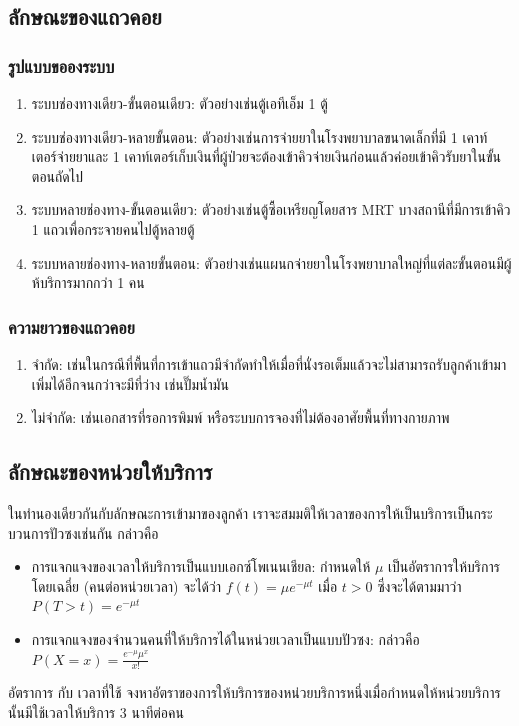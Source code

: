 \newpage
\subsection{ลักษณะของแถวคอย}
\subsubsection{รูปแบบขอองระบบ}
\begin{enumerate}
	\item ระบบช่องทางเดียว-ขั้นตอนเดียว: ตัวอย่างเช่นตู้เอทีเอ็ม 1 ตู้
	\item ระบบช่องทางเดียว-หลายขั้นตอน: ตัวอย่างเช่นการจ่ายยาในโรงพยาบาลขนาดเล็กที่มี 1 เคาท์เตอร์จ่ายยาและ 1 เคาท์เตอร์เก็บเงินที่ผู้ป่วยจะต้องเข้าคิวจ่ายเงินก่อนแล้วค่อยเข้าคิวรับยาในขั้นตอนถัดไป
	\item ระบบหลายช่องทาง-ขั้นตอนเดียว: ตัวอย่างเช่นตู้ซื้อเหรียญโดยสาร MRT บางสถานีที่มีการเข้าคิว 1 แถวเพื่อกระจายคนไปตู้หลายตู้
	\item ระบบหลายช่องทาง-หลายขั้นตอน: ตัวอย่างเช่นแผนกจ่ายยาในโรงพยาบาลใหญ่ที่แต่ละขั้นตอนมีผู้ห้บริการมากกว่า 1 คน 
\end{enumerate}

\subsubsection{ความยาวของแถวคอย}
\begin{enumerate}
	\item จำกัด: เช่นในกรณีที่พื้นที่การเข้าแถวมีจำกัดทำให้เมื่อที่นั่งรอเต็มแล้วจะไม่สามารถรับลูกค้าเข้ามาเพิ่มได้อีกจนกว่าจะมีที่ว่าง เช่นปั๊มน้ำมัน
	\item ไม่จำกัด: เช่นเอกสารที่รอการพิมพ์ หรือระบบการจองที่ไม่ต้องอาศัยพื้นที่ทางกายภาพ
\end{enumerate}

\subsection{ลักษณะของหน่วยให้บริการ}
ในทำนองเดียวกันกับลักษณะการเข้ามาของลูกค้า เราจะสมมติให้เวลาของการให้เป็นบริการเป็นกระบวนการปัวซงเช่นกัน กล่าวคือ
\begin{itemize}
	\item การแจกแจงของเวลาให้บริการเป็นแบบเอกซ์โพเนนเชียล: กำหนดให้ $\mu$ เป็นอัตราการให้บริการโดยเฉลี่ย (คนต่อหน่วยเวลา) จะได้ว่า $f(t)=\mu e^{-\mu t}$ เมื่อ $t>0$ ซึ่งจะได้ตามมาว่า
	\(
	P(T > t) = e^{-\mu t}
	\)
	\item การแจกแจงของจำนวนคนที่ให้บริการได้ในหน่วยเวลาเป็นแบบปัวซง: กล่าวคือ \(P(X=x) = \frac{e^{-\mu}\mu^x}{x!}\)
\end{itemize}
\begin{example}
	{อัตราการ กับ เวลาที่ใช้}{}
	จงหาอัตราของการให้บริการของหน่วยบริการหนึ่งเมื่อกำหนดให้หน่วยบริการนั้นมีใช้เวลาให้บริการ 3 นาทีต่อคน
\end{example}
\newpage
